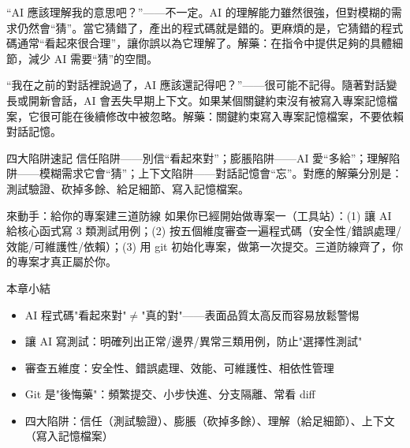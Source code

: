 
“AI 應該理解我的意思吧？”——不一定。AI 的理解能力雖然很強，但對模糊的需求仍然會“猜”。當它猜錯了，產出的程式碼就是錯的。更麻煩的是，它猜錯的程式碼通常“看起來很合理”，讓你誤以為它理解了。解藥：在指令中提供足夠的具體細節，減少 AI 需要“猜”的空間。


“我在之前的對話裡說過了，AI 應該還記得吧？”——很可能不記得。隨著對話變長或開新會話，AI 會丟失早期上下文。如果某個關鍵約束沒有被寫入專案記憶檔案，它很可能在後續修改中被忽略。解藥：關鍵約束寫入專案記憶檔案，不要依賴對話記憶。

\begin{tcbwarn}{四大陷阱速記}
信任陷阱——別信“看起來對”；膨脹陷阱——AI 愛“多給”；理解陷阱——模糊需求它會“猜”；上下文陷阱——對話記憶會“忘”。對應的解藥分別是：測試驗證、砍掉多餘、給足細節、寫入記憶檔案。

\end{tcbwarn}

\begin{tcbpractice}{來動手：給你的專案建三道防線}
如果你已經開始做專案一（工具站）：(1) 讓 AI 給核心函式寫 3 類測試用例；(2) 按五個維度審查一遍程式碼（安全性/錯誤處理/效能/可維護性/依賴）；(3) 用 git 初始化專案，做第一次提交。三道防線齊了，你的專案才真正屬於你。

\end{tcbpractice}

\begin{tcbsummary}{本章小結}
\begin{itemize}
  \item AI 程式碼"看起來對"$\neq$"真的對"——表面品質太高反而容易放鬆警惕
  \item 讓 AI 寫測試：明確列出正常/邊界/異常三類用例，防止"選擇性測試"
  \item 審查五維度：安全性、錯誤處理、效能、可維護性、相依性管理
  \item Git 是"後悔藥"：頻繁提交、小步快進、分支隔離、常看 diff
  \item 四大陷阱：信任（測試驗證）、膨脹（砍掉多餘）、理解（給足細節）、上下文（寫入記憶檔案）
\end{itemize}

\end{tcbsummary}
